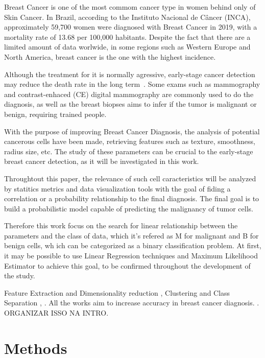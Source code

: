 \documentclass[conference]{IEEEtran}
\newcommand{\reviewUrgent}[1]{{\color{red} #1}} %
\begin{document}
Breast Cancer is one of the most commom cancer type in women behind only of Skin Cancer. In Brazil, according to the Instituto Nacional de Câncer (INCA), approximately 59,700 women were diagnosed with Breast Cancer in 2019, with a mortality rate of 13.68 per 100,000 habitants. 
Despite the fact that there are a limited amount of data worlwide, in some regions such as Western Europe and North America,
breast cancer is the one with the highest incidence.

Although the treatment for it is normally agressive, early-stage cancer detection may reduce the death rate in the long term~\cite{b1}. 
Some exams such as mammography and contrast-enhaced (CE) digital mammography are commonly used to do the diagnosis, as well as the breast biopses aims to infer if the tumor is malignant or benign, requiring trained people. 

With the purpose of improving Breast Cancer Diagnosis, the analysis of potential cancerous cells have been made,
retrieving features such as texture, smoothness, radius size, etc. The study of these parameters can be crucial 
to the early-stage breast cancer detection, as it will be investigated in this work. 

Throughtout this paper, the relevance of such cell caracteristics will be analyzed by statitics metrics and data visualization tools 
with the goal of fiding a correlation or a probability relationship to the final diagnosis. The final goal is to 
build a probabilistic model capable of predicting the malignancy of tumor cells.

Therefore this work focus on the search for linear relationship between the parameters 
and the class of data, which it's refered as M for malignant and B for benign cells, wh ich can be 
categorized as a binary classification problem. At first, it may be possible to use 
Linear Regression techniques and Maximum Likelihood Estimator to achieve this goal, to be 
confirmed throughout the development of the study.

Feature Extraction and Dimensionality reduction \cite{Street1993}, 
Clustering and Class Separation \cite{Mangasarian1995}, \cite{Bennett1992}.
All the works aim to increase accuracy in breast cancer diagnosis.
\cite{Wolberg1994}.
\reviewUrgent{ORGANIZAR ISSO NA INTRO.}


\section{Methods}
\end{document}
